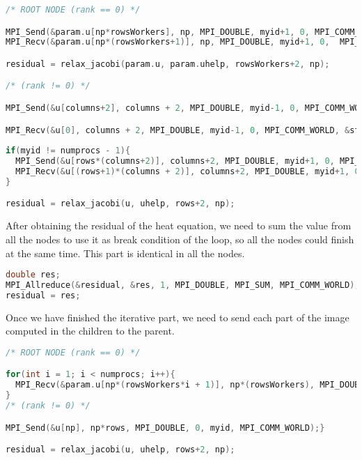 \documentclass[a4paper, 10pt]{article}
\begin{document}
\begin{lstlisting}[language=c, caption={Communications between nodes inside the iterations}]
/* ROOT NODE (rank == 0) */

MPI_Send(&param.u[np*rowsWorkers], np, MPI_DOUBLE, myid+1, 0, MPI_COMM_WORLD);
MPI_Recv(&param.u[np*(rowsWorkers+1)], np, MPI_DOUBLE, myid+1, 0,  MPI_COMM_WORLD, &status);

residual = relax_jacobi(param.u, param.uhelp, rowsWorkers+2, np); 

/* (rank != 0) */

MPI_Send(&u[columns+2], columns + 2, MPI_DOUBLE, myid-1, 0, MPI_COMM_WORLD);

MPI_Recv(&u[0], columns + 2, MPI_DOUBLE, myid-1, 0, MPI_COMM_WORLD, &status);
                    
if(myid != numprocs - 1){
  MPI_Send(&u[rows*(columns+2)], columns+2, MPI_DOUBLE, myid+1, 0, MPI_COMM_WORLD);
  MPI_Recv(&u[(rows+1)*(columns + 2)], columns+2, MPI_DOUBLE, myid+1, 0, MPI_COMM_WORLD, &status);
}

residual = relax_jacobi(u, uhelp, rows+2, np);
\end{lstlisting}

After obtaining the residual of the heat equation, we need to sum the value from all the nodes to use it as break condition of the loop, so all the nodes could finish at the same time. This part is identical in all the nodes.

\begin{lstlisting}[language=c, caption={Allreduce for residual value}]
double res;
MPI_Allreduce(&residual, &res, 1, MPI_DOUBLE, MPI_SUM, MPI_COMM_WORLD);
residual = res;
\end{lstlisting}

Once we have finished the iterative part, we need to send each part of the image computed in the children to the parent.

\begin{lstlisting}[language=c, caption={Communication of the computed image to the parent}]
/* ROOT NODE (rank == 0) */

for(int i = 1; i < numprocs; i++){
  MPI_Recv(&param.u[np*(rowsWorkers*i + 1)], np*(rowsWorkers), MPI_DOUBLE, i, i, MPI_COMM_WORLD, &status);
}
/* (rank != 0) */

MPI_Send(&u[np], np*rows, MPI_DOUBLE, 0, myid, MPI_COMM_WORLD);}

residual = relax_jacobi(u, uhelp, rows+2, np);
\end{lstlisting}
\end{document}
